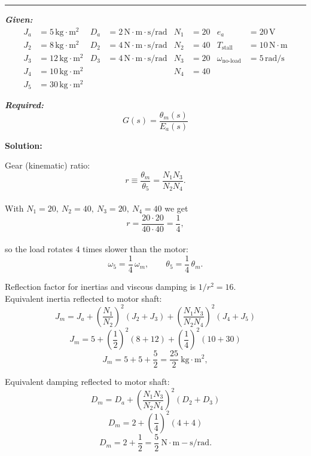 \documentclass[11pt]{article}
\begin{document}
\noindent\rule{\textwidth}{1pt}

\vspace{12pt}

\noindent\textbf{\textit{Given:}}
\[
\begin{aligned}
J_a &= 5\, \text{kg}\cdot\text{m}^2 & D_a &= 2\, \text{N}\cdot\text{m}\cdot\text{s/rad} & N_1 &= 20 & e_a &= 20\,\text{V} \\
J_2 &= 8\, \text{kg}\cdot\text{m}^2 & D_2 &= 4\, \text{N}\cdot\text{m}\cdot\text{s/rad} & N_2 &= 40 & T_{\text{stall}} &= 10\,\text{N}\cdot\text{m} \\
J_3 &= 12\, \text{kg}\cdot\text{m}^2 & D_3 &= 4\, \text{N}\cdot\text{m}\cdot\text{s/rad} & N_3 &= 20 & \omega_{\text{no-load}} &= 5\,\text{rad/s} \\
J_4 &= 10\, \text{kg}\cdot\text{m}^2 & & & N_4 &= 40 & & \\
J_5 &= 30\, \text{kg}\cdot\text{m}^2 & & & & & &
\end{aligned}
\]

\vspace{12pt}

\noindent\textbf{\textit{Required:}}
\[
G(s) = \frac{\theta_m(s)}{E_a(s)}
\]

\vspace{12pt}

\noindent \textbf{Solution:}

Gear (kinematic) ratio:
\[
r \equiv \frac{\theta_m}{\theta_5}=\frac{N_1 N_3}{N_2 N_4}.
\]  \\

With \(N_1=20,\ N_2=40,\ N_3=20,\ N_4=40\) we get
\[
r=\frac{20 \cdot 20}{40 \cdot 40}=\frac{1}{4},
\] \\

so the load rotates 4 times slower than the motor:
\[
\omega_5 = \frac{1}{4}\,\omega_m,\qquad \theta_5 = \frac{1}{4}\,\theta_m.
\]

Reflection factor for inertias and viscous damping is \(1/r^2 = 16\). \\

Equivalent inertia reflected to motor shaft:
\[
J_m = J_a + \left(\frac{N_1}{N_2}\right)^2 (J_2 + J_3) + \left(\frac{N_1 N_3}{N_2 N_4}\right)^2 (J_4 + J_5)
\]
\[
J_m = 5 + \left(\frac{1}{2}\right)^2 (8 + 12) + \left(\frac{1}{4}\right)^2 (10 + 30)
\]
\[
J_m = 5 + 5 + \frac{5}{2} = \frac{25}{2}\ \mathrm{kg\cdot m^2},
\]

Equivalent damping reflected to motor shaft:
\[
D_m = D_a + \left(\frac{N_1 N_3}{N_2 N_4}\right)^2 (D_2 + D_3)
\]
\[
D_m = 2 + \left(\frac{1}{4}\right)^2 (4 + 4)
\]
\[
D_m = 2 + \frac{1}{2} = \frac{5}{2}\ \mathrm{N\cdot m\!-\!s/rad}.
\]
\end{document}
